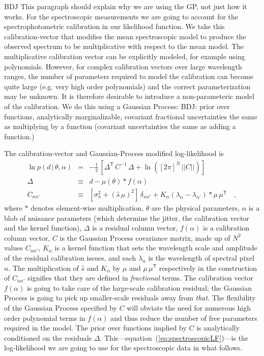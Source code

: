 \documentclass[iop,numberedappendix]{emulateapj}
\newcommand{\transpose}[1]{{#1}^{\!\mathsf T}}
\newcommand{\given}{\,|\,}
\renewcommand{\det}[1]{||{#1}||}
\begin{document}
{\color{blue} BDJ This paragraph should explain why we are using the
GP, not just how it works.}
For the spectroscopic measurements we are going to account for the
spectrophotometric calibration in our likelihood function.  We take
this calibration-vector that modifies the mean spectroscopic model to
produce the observed spectrum to be multiplicative with respect to the
mean model.  The multiplicative calibration vector can be explicitly
modeled, for example using polynomials.  However, for complex
calibration vectors over large wavelength ranges, the number of
parameters required to model the calibration can become quite large
(e.g. very high order polynomials) and the correct parameterization
may be unknown.  It is therefore desirable to introduce a
non-parameteric model of the calibration.  We do this using a Gaussian
Process: BDJ: prior over functions, analytically marginalizable,
covariant fractional uncertainties the same as multiplying by a
function (covariant uncertainties the same as adding a function.)

The calibration-vector and Gaussian-Process modified log-likelihood is
\begin{eqnarray}\label{eq:spectroscopicLF_v2}
\ln p(d\given\theta,\alpha) &=&
                                -\frac{1}{2}\,\left[\transpose{\Delta}\,C^{-1}\,\Delta
                                + \ln([2\pi]^N\,\det{C}) \right]
\\
\Delta &\equiv& d - \mu(\theta) \ast f(\alpha) 
\\
C_{nn'} &\equiv& [\sigma_n^2 + (\hat{s} \, \mu)^2]\,\delta_{nn'} +
 K_\alpha(\lambda_n - \lambda_{n'}) \ast \mu \, \transpose{\mu}
\quad ,
\end{eqnarray}
where $\ast$ denotes element-wise multiplication,
$\theta$ are the physical parameters,
$\alpha$ is a blob of nuisance parameters
(which determine the jitter, the calibration vector and the kernel function),
$\Delta$ is a residual column vector,
$f(\alpha)$ is a calibration column vector,
$C$ is the Gaussian Process covariance matrix,
made up of $N^2$ values $C_{nn'}$,
$K_\alpha$ is a kernel function that sets the wavelength scale and
amplitude of the residual calibration issues,
and each $\lambda_n$ is the wavelength of spectral pixel $n$.
The multiplication of $\hat{s}$ and $K_\alpha$ by $\mu$ and
$\mu\,\transpose{\mu}$ respectively in the construction of $C_{nn'}$
signifies that they are defined in \emph{fractional} terms.
The calibration vector $f(\alpha)$ is going to take care of the
large-scale calibration residual; the Gaussian Process is going to
pick up smaller-scale residuals away from \emph{that}.
The flexibility of the Gaussian Process specified by $C$ will obviate
the need for numerous high order polynomial terms in $f(\alpha)$ and
thus reduce the number of free parameters required in the model.  The
prior over functions implied by $C$ is analytically conditioned on the
residuals $\Delta$.
This---equation~(\ref{eq:spectroscopicLF})---is the log-likelihood we
are going to use for the spectroscopic data in what follows.
\end{document}
